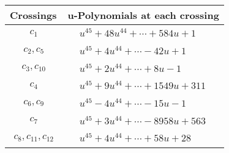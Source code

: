 \documentclass[1p]{elsarticle_modified}
\theoremstyle{definition}
\begin{document}
\begin{tabular}{m{50pt}|m{274pt}}
Crossings & \hspace{64pt}u-Polynomials at each crossing \\
\hline $$\begin{aligned}c_{1}\end{aligned}$$&$\begin{aligned}
&u^{45}+48 u^{44}+\cdots+584 u+1
\end{aligned}$\\
\hline $$\begin{aligned}c_{2},c_{5}\end{aligned}$$&$\begin{aligned}
&u^{45}+4 u^{44}+\cdots-42 u+1
\end{aligned}$\\
\hline $$\begin{aligned}c_{3},c_{10}\end{aligned}$$&$\begin{aligned}
&u^{45}+2 u^{44}+\cdots+8 u-1
\end{aligned}$\\
\hline $$\begin{aligned}c_{4}\end{aligned}$$&$\begin{aligned}
&u^{45}+9 u^{44}+\cdots+1549 u+311
\end{aligned}$\\
\hline $$\begin{aligned}c_{6},c_{9}\end{aligned}$$&$\begin{aligned}
&u^{45}-4 u^{44}+\cdots-15 u-1
\end{aligned}$\\
\hline $$\begin{aligned}c_{7}\end{aligned}$$&$\begin{aligned}
&u^{45}+3 u^{44}+\cdots-8958 u+563
\end{aligned}$\\
\hline $$\begin{aligned}c_{8},c_{11},c_{12}\end{aligned}$$&$\begin{aligned}
&u^{45}+4 u^{44}+\cdots+58 u+28
\end{aligned}$\\
\hline
\end{tabular}\\~\\
\newpage\renewcommand{\arraystretch}{1}
\end{document}
